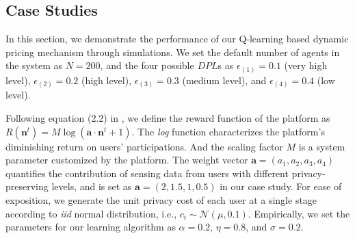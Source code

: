 \subsection{Case Studies}
In this section, we demonstrate the performance of our Q-learning based dynamic pricing mechanism through simulations. We set the default number of agents in the system as $N=200$, and the four possible $DPL$s  as $\epsilon_{(1)}=0.1$ (very high level), $\epsilon_{(2)}=0.2$ (high level), $\epsilon_{(3)}=0.3$ (medium level), and $\epsilon_{(4)}=0.4$ (low level). 

Following equation (2.2) in \cite{DejunJ}, we define the reward function of the platform as $R(\mathbf{n}^t)=M\log(\mathbf{a}\cdot\mathbf{n}^t+1)$. The \emph{log} function characterizes the platform's diminishing return on users' participations. And the scaling factor $M$ is a system parameter customized by the platform. The weight vector $\mathbf{a}=(a_1,a_2,a_3,a_4)$ quantifies the contribution of sensing data from users with different privacy-preserving levels, and is set as $\mathbf{a}=(2, 1.5, 1, 0.5)$ in our case study. For ease of exposition, we generate the unit privacy cost of each user at a single stage according to \emph{iid} normal distribution, i.e., $c_i\sim\mathcal{N}(\mu,0.1)$. Empirically, we set the parameters for our learning algorithm as $\alpha=0.2$, $\eta=0.8$, and $\sigma=0.2$. 

